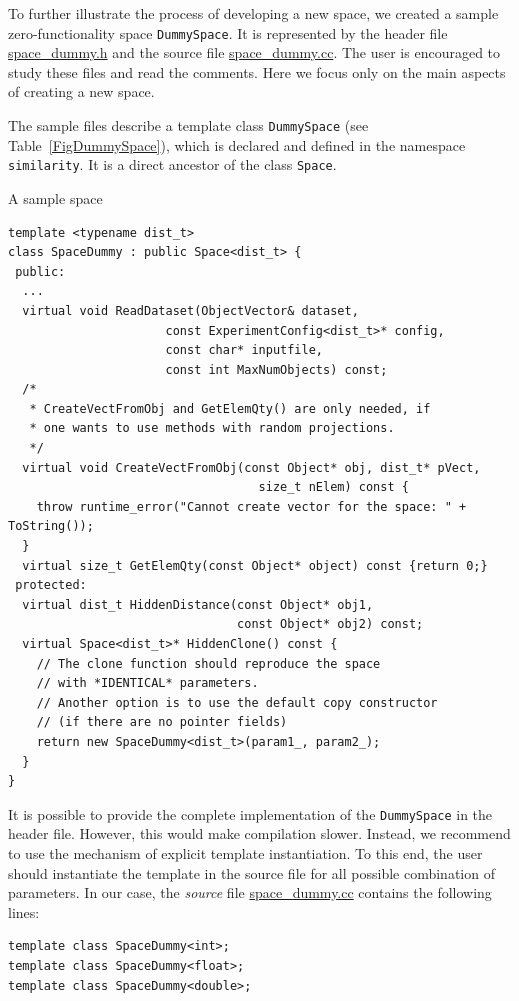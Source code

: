 \documentclass[runningheads,a4paper]{llncs}
\newcommand{\replocfile}{https://github.com/searchivarius/NonMetricSpaceLib/blob/pserv/}
\newcommand{\ttt}[1]{\texttt{#1}}
\begin{document}
To further illustrate the process of developing a new space,
we created a sample zero-functionality space \ttt{DummySpace}.
It is represented by 
the header file 
\href{\replocfile  similarity_search/include/space/space_dummy.h}{space\_dummy.h}
and the source file
\href{\replocfile similarity_search/src/space/space_dummy.cc}{space\_dummy.cc}.
The user is encouraged to study these files and read the comments.
Here we focus only on the main aspects of creating a new space.

The sample files describe a template class \ttt{DummySpace} (see Table~\ref{FigDummySpace}), 
which is declared and defined in the namespace \ttt{similarity}.
It is a direct ancestor of the class \ttt{Space}.

\begin{table}[t]
\caption{\label{FigDummySpace}A sample space}
\begin{verbatim}
template <typename dist_t>
class SpaceDummy : public Space<dist_t> {
 public:
  ...
  virtual void ReadDataset(ObjectVector& dataset,
                      const ExperimentConfig<dist_t>* config,
                      const char* inputfile,
                      const int MaxNumObjects) const;
  /*
   * CreateVectFromObj and GetElemQty() are only needed, if
   * one wants to use methods with random projections.
   */
  virtual void CreateVectFromObj(const Object* obj, dist_t* pVect,
                                   size_t nElem) const {
    throw runtime_error("Cannot create vector for the space: " + ToString());
  }
  virtual size_t GetElemQty(const Object* object) const {return 0;}
 protected:
  virtual dist_t HiddenDistance(const Object* obj1, 
                                const Object* obj2) const;
  virtual Space<dist_t>* HiddenClone() const {
    // The clone function should reproduce the space 
    // with *IDENTICAL* parameters. 
    // Another option is to use the default copy constructor 
    // (if there are no pointer fields)
    return new SpaceDummy<dist_t>(param1_, param2_);
  }
}
\end{verbatim}
\end{table}

It is possible to provide the complete implementation of the \ttt{DummySpace}
in the header file. However, this would make compilation slower.
Instead, we recommend to use the mechanism of explicit template instantiation.
To this end, the user should instantiate the template in the source file
for all possible combination of parameters.
In our case, the \emph{source} file 
\href{\replocfile similarity_search/src/space/space_dummy.cc}{space\_dummy.cc}
contains the following lines:
\begin{verbatim}
template class SpaceDummy<int>;
template class SpaceDummy<float>;
template class SpaceDummy<double>;
\end{verbatim}
\end{document}
